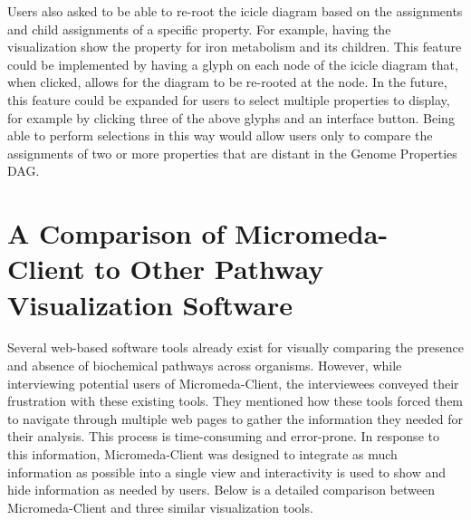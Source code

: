 Users also asked to be able to re-root the icicle diagram based on the assignments and child assignments of a specific property. For example, having the visualization show the property for iron metabolism and its children. This feature could be implemented by having a glyph on each node of the icicle diagram that, when clicked, allows for the diagram to be re-rooted at the node. In the future, this feature could be expanded for users to select multiple properties to display, for example by clicking three of the above glyphs and an interface button. Being able to perform selections in this way would allow users only to compare the assignments of two or more properties that are distant in the Genome Properties DAG.

\section{A Comparison of Micromeda-Client to Other Pathway Visualization Software} \label{visualization-comparison}

Several web-based software tools already exist for visually comparing the presence and absence of biochemical pathways across organisms. However, while interviewing potential users of Micromeda-Client, the interviewees conveyed their frustration with these existing tools. They mentioned how these tools forced them to navigate through multiple web pages to gather the information they needed for their analysis. This process is time-consuming and error-prone. In response to this information, Micromeda-Client was designed to integrate as much information as possible into a single view and interactivity is used to show and hide information as needed by users. Below is a detailed comparison between Micromeda-Client and three similar visualization tools.

